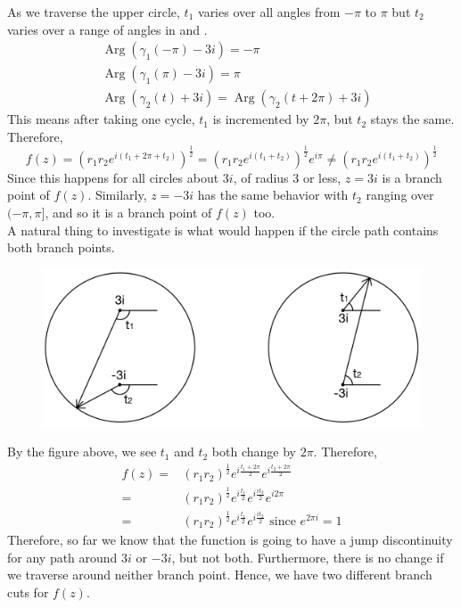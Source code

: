 \documentclass[11pt]{article}
\begin{document}
As we traverse the upper circle, $t_1$ varies over all angles from $-\pi$ to $\pi$ but $t_2$ varies over a range of angles in  and . 
\begin{align*}
&\operatorname{Arg}(\gamma_1(-\pi) - 3i) = -\pi \\ 
&\operatorname{Arg}(\gamma_1(\pi) - 3i) = \pi \\
&\operatorname{Arg}(\gamma_2(t) + 3i) = \operatorname{Arg}\left(\gamma_2(t + 2\pi) + 3i\right)
\end{align*}
This means after taking one cycle, $t_1$ is incremented by $2\pi$, but $t_2$ stays the same. Therefore, 
$$ f(z) = \left(r_1r_2e^{i(t_1 + 2\pi + t_2)}\right)^{\frac{1}{2}} = \left(r_1r_2e^{i(t_1 + t_2)}\right)^{\frac{1}{2}}e^{i\pi} \neq \left(r_1r_2e^{i(t_1 + t_2)}\right)^{\frac{1}{2}}$$
Since this happens for all circles about $3i$, of radius 3 or less, $z = 3i$ is a branch point of $f(z)$. Similarly, $z = -3i$ has the same behavior with $t_2$ ranging over $(-\pi, \pi]$, and so it is a branch point of $f(z)$ too. \\
A natural thing to investigate is what would happen if the circle path contains both branch points. 
\begin{figure}[H]
\includegraphics[scale = 0.2]{5_6}
\centering
\end{figure}
By the figure above, we see $t_1$ and $t_2$ both change by $2\pi$. Therefore, 
\begin{align*}
f(z) =&(r_1r_2)^{\frac{1}{2}}e^{i\frac{t_1 + 2\pi}{2}}e^{i\frac{t_2 + 2\pi}{2}} \\
= &(r_1r_2)^{\frac{1}{2}}e^{i\frac{t_1}{2}}e^{i\frac{it_2}{2}}e^{i2\pi}\\
= &(r_1r_2)^{\frac{1}{2}}e^{i\frac{t_1}{2}}e^{i\frac{it_2}{2}} \text{ since } e^{2\pi i} = 1
\end{align*}
Therefore, so far we know that the function is going to have a jump discontinuity for any path around $3i$ or $-3i$, but not both. Furthermore, there is no change if we traverse around neither branch point. Hence, we have two different branch cuts for $f(z)$.
\end{document}
